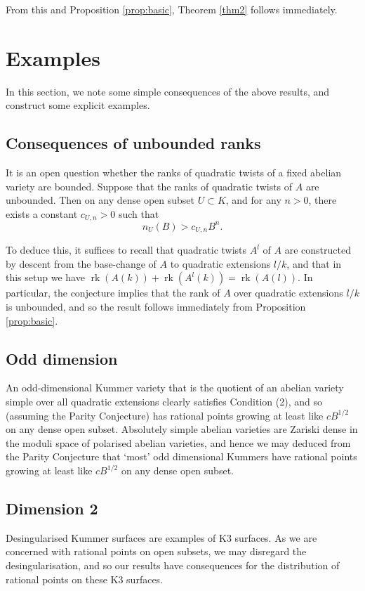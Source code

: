 \documentclass[a4paper,12pt]{amsart}
\begin{document}
From this and Proposition \ref{prop:basic}, Theorem \ref{thm2} follows immediately. 

\section{Examples}
In this section, we note some simple consequences of the above results, and construct some explicit examples. 

\subsection{Consequences of unbounded ranks}
It is an open question whether the ranks of quadratic twists of a fixed abelian variety are bounded. Suppose that the ranks of quadratic twists of $A$ are unbounded. Then on any dense open subset $U \subset K$, and for any $n>0$, there exists a constant $c_{U,n} > 0$ such that 
\begin{equation}
n_U(B) > c_{U,n} B^n. 
\end{equation}

To deduce this, it suffices to recall that quadratic twists $A^l$ of $A$ are constructed by descent from the base-change of $A$ to quadratic extensions $l/k$, and that in this setup we have ${\operatorname{rk}}(A(k)) + {\operatorname{rk}}(A^l(k)) = {\operatorname{rk}}(A(l))$. In particular, the conjecture implies that the rank of $A$ over quadratic extensions $l/k$ is unbounded, and so the result follows immediately from Proposition \ref{prop:basic}. 

\subsection{Odd dimension}
An odd-dimensional Kummer variety that is the quotient of an abelian variety simple over all quadratic extensions clearly satisfies Condition (2), and so (assuming the Parity Conjecture) has rational points growing at least like $c B^{1/2}$ on any dense open subset. Absolutely simple abelian varieties are Zariski dense in the moduli space of polarised abelian varieties, and hence we may deduced from the Parity Conjecture that `most' odd dimensional Kummers have rational points growing at least like $c B^{1/2}$ on any dense open subset. 

\subsection{Dimension 2}
Desingularised Kummer surfaces are examples of K3 surfaces. As we are concerned with rational points on open subsets, we may disregard the desingularisation, and so our results have consequences for the distribution of rational points on these K3 surfaces. 
\end{document}
